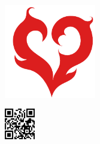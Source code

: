 \documentclass[11pt,a4paper]{article}
\begin{document}
\pagebreak

\thispagestyle{empty}
\mbox{}

\vspace{7cm}

\begin{center}
\includegraphics[width=0.3\textwidth]{media/coderbyheart-logo.pdf}
\end{center}

\vspace{7cm}

\begin{center}
\includegraphics[width=0.1\textwidth]{media/coderbyheart-qrcode.png}
\end{center}
\end{document}
